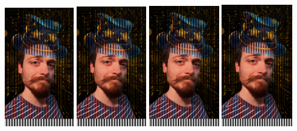 \documentclass{article}
\begin{document}
%
%


\includegraphics[width=1.21in]{mag_gi_interlaced_horizontal.png}
\includegraphics[width=1.22in]{mag_gi_interlaced_horizontal.png}
\includegraphics[width=1.23in]{mag_gi_interlaced_horizontal.png}
\includegraphics[width=1.24in]{mag_gi_interlaced_horizontal.png}
\end{document}
